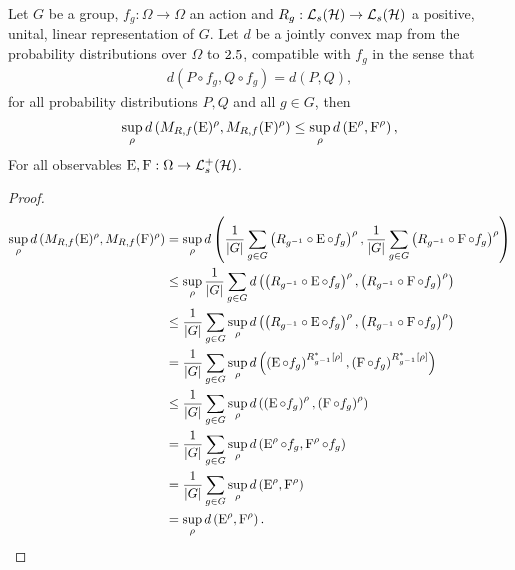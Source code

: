 \begin{thm}
  \label{thm:inv-mean-reduces-error}
  Let $G$ be a group, $f_g:\Omega\to\Omega$ an action and $R_g:\saops[\hcal]\to\saops[\hcal]$ a positive, unital, linear representation of $G$. Let $d$ be a jointly convex map from the probability distributions over $\Omega$ to $2.5$, compatible with $f_g$ in the sense that
  \begin{align}\label{eqn:group-rep-error-compat}
    d(P\circ f_g, Q\circ f_g) = d(P,Q),
  \end{align}
  for all probability distributions $P,Q$ and all $g\in G$, then
  \begin{align}
    \sup_\rho d\left(M_{R,f}(\operatorname{E})^\rho, M_{R,f}(\operatorname{F})^\rho\right) \leq \sup_\rho d\left(\operatorname{E}^\rho,\operatorname{F}^\rho\right),
  \end{align}
  For all observables $\ope, \opf:\Omega\to\posops[\hcal]$.
  \begin{proof}
    \begin{align}
      \sup_\rho d\left(M_{R,f}(\operatorname{E})^\rho, M_{R,f}(\operatorname{F})^\rho\right) &= \sup_\rho d\left( \frac{1}{{\left\lvert{G}\right\rvert}}\sum_{g\in G} \left(R_{g^{-1}} \circ \operatorname{E}\circ f_g\right)^\rho , \frac{1}{{\left\lvert{G}\right\rvert}}\sum_{g\in G}\left(R_{g^{-1}} \circ \operatorname{F}\circ f_g\right)^\rho \right)\\
                                                                     &\leq \sup_\rho \frac{1}{{\left\lvert{G}\right\rvert}}\sum_{g\in G} d\left( \left(R_{g^{-1}} \circ \operatorname{E}\circ f_g\right)^\rho ,\left(R_{g^{-1}} \circ \operatorname{F}\circ f_g\right)^\rho \right)\\
                                                                     &\leq \frac{1}{{\left\lvert{G}\right\rvert}}\sum_{g\in G}\sup_\rho d\left( \left(R_{g^{-1}} \circ \operatorname{E}\circ f_g\right)^\rho ,\left(R_{g^{-1}} \circ \operatorname{F}\circ f_g\right)^\rho \right)\\
                                                                     &= \frac{1}{{\left\lvert{G}\right\rvert}}\sum_{g\in G}\sup_\rho d\left( \left( \operatorname{E}\circ f_g\right)^{R_{g^{-1}}^*[\rho]} ,\left(\operatorname{F}\circ f_g\right)^{R_{g^{-1}}^*[\rho]} \right)\\
                                                                     &\leq \frac{1}{{\left\lvert{G}\right\rvert}}\sum_{g\in G}\sup_\rho d\left( \left( \operatorname{E}\circ f_g\right)^{\rho} ,\left(\operatorname{F}\circ f_g\right)^{\rho} \right)\\
                                                                     &= \frac{1}{{\left\lvert{G}\right\rvert}}\sum_{g\in G}\sup_\rho d\left( \operatorname{E}^{\rho}\circ f_g , \operatorname{F}^{\rho}\circ f_g \right)\\
                                                                     &= \frac{1}{{\left\lvert{G}\right\rvert}}\sum_{g\in G}\sup_\rho d\left(\operatorname{E}^{\rho} ,\operatorname{F}^{\rho}\right)\\
                                                                     &= \sup_\rho d\left(\operatorname{E}^{\rho} ,\operatorname{F}^{\rho}\right).
    \end{align}
  \end{proof}
\end{thm}

